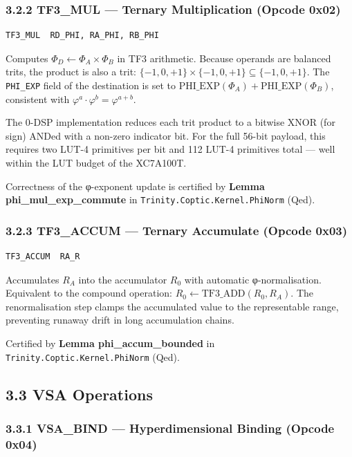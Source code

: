 \subsubsection{3.2.2 TF3\_MUL --- Ternary Multiplication (Opcode 0x02)}

\begin{verbatim}
TF3_MUL  RD_PHI, RA_PHI, RB_PHI
\end{verbatim}

Computes \(\Phi_D \leftarrow \Phi_A \times \Phi_B\) in TF3
arithmetic. Because operands are balanced trits, the product is
also a trit:
\(\{-1,0,+1\} \times \{-1,0,+1\} \subseteq \{-1,0,+1\}\).
The \texttt{PHI\_EXP} field of the destination is set to
\(\text{PHI\_EXP}(\Phi_A) + \text{PHI\_EXP}(\Phi_B)\),
consistent with \(\varphi^a \cdot \varphi^b = \varphi^{a+b}\).

The 0-DSP implementation reduces each trit product to a bitwise
XNOR (for sign) ANDed with a non-zero indicator bit. For the
full 56-bit payload, this requires two LUT-4 primitives per bit
and 112 LUT-4 primitives total --- well within the LUT budget
of the XC7A100T.

Correctness of the φ-exponent update is certified by
\textbf{Lemma phi\_mul\_exp\_commute} in
\texttt{Trinity.Coptic.Kernel.PhiNorm} (Qed).

\subsubsection{3.2.3 TF3\_ACCUM --- Ternary Accumulate (Opcode 0x03)}

\begin{verbatim}
TF3_ACCUM  RA_R
\end{verbatim}

Accumulates \(R_A\) into the accumulator \(R_0\) with
automatic φ-normalisation. Equivalent to the compound operation:
\(R_0 \leftarrow \text{TF3\_ADD}(R_0, R_A)\). The
renormalisation step clamps the accumulated value to the
representable range, preventing runaway drift in long
accumulation chains.

Certified by \textbf{Lemma phi\_accum\_bounded} in
\texttt{Trinity.Coptic.Kernel.PhiNorm} (Qed).

\subsection{3.3 VSA Operations}\label{fa_71:vsa-operations}

\subsubsection{3.3.1 VSA\_BIND --- Hyperdimensional Binding (Opcode 0x04)}

